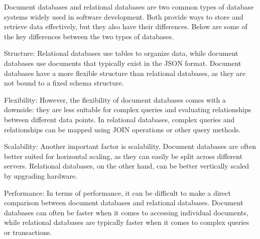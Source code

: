 Document databases and relational databases are two common types of database systems widely used 
in software development. Both provide ways to store and retrieve data effectively, but they also 
have their differences. Below are some of the key differences between the two types of databases.

Structure: Relational databases use tables to organize data, while document databases use 
documents that typically exist in the JSON format. Document databases have a more flexible 
structure than relational databases, as they are not bound to a fixed schema structure.

Flexibility: However, the flexibility of document databases comes with a downside: they are less 
suitable for complex queries and evaluating relationships between different data points. In 
relational databases, complex queries and relationships can be mapped using JOIN operations or 
other query methods.

Scalability: Another important factor is scalability. Document databases are often better suited 
for horizontal scaling, as they can easily be split across different servers. Relational databases,
 on the other hand, can be better vertically scaled by upgrading hardware.

Performance: In terms of performance, it can be difficult to make a direct comparison between 
document databases and relational databases. Document databases can often be faster when it comes 
to accessing individual documents, while relational databases are typically faster when it comes 
to complex queries or transactions.







